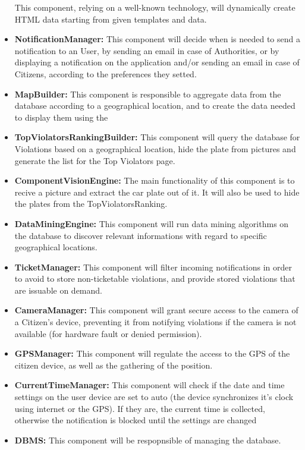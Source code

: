 \documentclass{article}
\begin{document}
\begin{itemize}
		 	This component, relying on a well-known technology, will dynamically create HTML data starting from given templates and data.
		 \item \label{component:NotificationManager} \textbf{NotificationManager:}
		 	This component will decide when is needed to send a notification to an User, by sending an email in case of Authorities, or by displaying a notification 
		 	on the application and/or sending an email in case of Citizens, according to the preferences they setted.
		 \item \label{component:MapBuilder} \textbf{MapBuilder:}
		 	This component is responsible to aggregate data from the database according to a geographical location, and to create the data needed to display them
		 	using the %
		 \item \label{component:TopViolatorsRankingBuilder} \textbf{TopViolatorsRankingBuilder:}
		 	This component will query the database for Violations based on a geographical location, hide the plate from pictures and
		 	generate the list for the Top Violators page.
		 \item \label{component:ComputerVisionEngine} \textbf{ComponentVisionEngine:}
		 	The main functionality of this component is to recive a picture and extract the car plate out of it.
		 	It will also be used to hide the plates from the TopViolatorsRanking.
		 \item \label{component:DataMiningEngine} \textbf{DataMiningEngine:}
		 	This component will run data mining algorithms on the database to discover relevant informations with regard to specific geographical
		 	locations.
		 \item \label{component:TicketManager} \textbf{TicketManager:}
		 	This component will filter incoming notifications in order to avoid to store non-ticketable violations, and provide stored violations that are
		 	issuable on demand.
		 \item \label{component:CameraManager} \textbf{CameraManager:}
		 	This component will grant secure access to the camera of a Citizen's device, preventing it from notifying violations if the camera is not 
		 	available (for hardware fault or denied permission).
		 \item \label{component:GPSManager} \textbf{GPSManager:}
		 	This component will regulate the access to the GPS of the citizen device, as well as the gathering of the position.
		 \item \label{component:CurrentTimeManager} \textbf{CurrentTimeManager:}
		 	This component will check if the date and time settings on the user device are set to auto (the device synchronizes it's clock using 
		 	internet or the GPS). If they are, the current time is collected, otherwise the notification is blocked until the settings are changed
		 \item \label{component:DBMS} \textbf{DBMS:}
		 	This component will be respopnsible of managing the database.
	\end{itemize}
\end{document}
